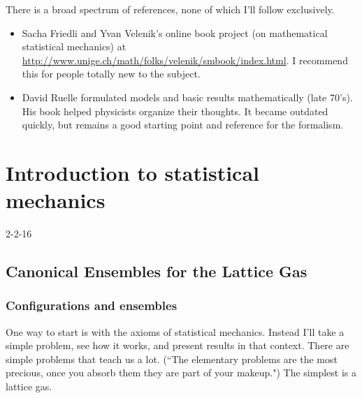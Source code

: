 \documentclass[12pt]{book}
\theoremstyle{norm}
\begin{document}
There is a broad spectrum of references, none of which I'll follow exclusively. 
\begin{itemize}
\item
Sacha Friedli and Yvan Velenik's online book project (on mathematical statistical mechanics) at \url{http://www.unige.ch/math/folks/velenik/smbook/index.html}. I recommend this for people totally new to the subject.
\item
David Ruelle formulated models and basic results mathematically (late 70's). His book helped physicists organize their thoughts. It became outdated quickly, but remains a good starting point and reference for the formalism.
\end{itemize}




\chapter{Introduction to statistical mechanics}

{\color{blue}2-2-16}

\section{Canonical Ensembles for the Lattice Gas}
\subsection{Configurations and ensembles}
One way to start is with the axioms of statistical mechanics. Instead I'll take a simple problem, see how it works, and present results in that context. There are simple problems that teach us a lot. (``The elementary problems are the most precious, once you absorb them they are part of your makeup.") The simplest is a lattice gas.
\end{document}
